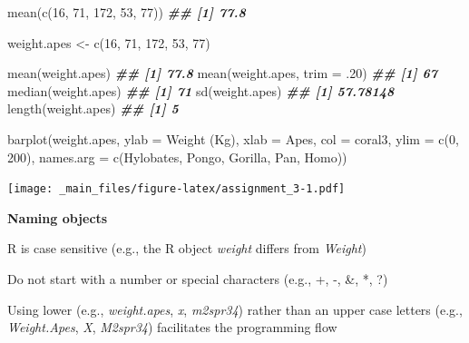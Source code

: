 \documentclass[
]{book}
\newenvironment{Shaded}{\begin{snugshade}}{\end{snugshade}}
\newcommand{\AttributeTok}[1]{\textcolor[rgb]{0.77,0.63,0.00}{#1}}
\newcommand{\DecValTok}[1]{\textcolor[rgb]{0.00,0.00,0.81}{#1}}
\newcommand{\DocumentationTok}[1]{\textcolor[rgb]{0.56,0.35,0.01}{\textbf{\textit{#1}}}}
\newcommand{\FunctionTok}[1]{\textcolor[rgb]{0.00,0.00,0.00}{#1}}
\newcommand{\NormalTok}[1]{#1}
\newcommand{\OtherTok}[1]{\textcolor[rgb]{0.56,0.35,0.01}{#1}}
\newcommand{\StringTok}[1]{\textcolor[rgb]{0.31,0.60,0.02}{#1}}
\theoremstyle{definition}
\theoremstyle{definition}
\theoremstyle{definition}
\theoremstyle{definition}
\theoremstyle{remark}
\begin{document}
\begin{Shaded}
\begin{Highlighting}[]

\FunctionTok{mean}\NormalTok{(}\FunctionTok{c}\NormalTok{(}\DecValTok{16}\NormalTok{, }\DecValTok{71}\NormalTok{, }\DecValTok{172}\NormalTok{, }\DecValTok{53}\NormalTok{, }\DecValTok{77}\NormalTok{))}
\DocumentationTok{\#\# [1] 77.8}

\NormalTok{weight.apes }\OtherTok{\textless{}{-}} \FunctionTok{c}\NormalTok{(}\DecValTok{16}\NormalTok{, }\DecValTok{71}\NormalTok{, }\DecValTok{172}\NormalTok{, }\DecValTok{53}\NormalTok{, }\DecValTok{77}\NormalTok{)}

\FunctionTok{mean}\NormalTok{(weight.apes)}
\DocumentationTok{\#\# [1] 77.8}
\FunctionTok{mean}\NormalTok{(weight.apes, }\AttributeTok{trim =}\NormalTok{ .}\DecValTok{20}\NormalTok{)}
\DocumentationTok{\#\# [1] 67}
\FunctionTok{median}\NormalTok{(weight.apes)}
\DocumentationTok{\#\# [1] 71}
\FunctionTok{sd}\NormalTok{(weight.apes)}
\DocumentationTok{\#\# [1] 57.78148}
\FunctionTok{length}\NormalTok{(weight.apes)}
\DocumentationTok{\#\# [1] 5}

\FunctionTok{barplot}\NormalTok{(weight.apes, }\AttributeTok{ylab =} \StringTok{\textquotesingle{}Weight (Kg)\textquotesingle{}}\NormalTok{, }\AttributeTok{xlab =} \StringTok{\textquotesingle{}Apes\textquotesingle{}}\NormalTok{,}
        \AttributeTok{col =} \StringTok{\textquotesingle{}coral3\textquotesingle{}}\NormalTok{, }\AttributeTok{ylim =} \FunctionTok{c}\NormalTok{(}\DecValTok{0}\NormalTok{, }\DecValTok{200}\NormalTok{),}
        \AttributeTok{names.arg =} \FunctionTok{c}\NormalTok{(}\StringTok{\textquotesingle{}Hylobates\textquotesingle{}}\NormalTok{, }\StringTok{\textquotesingle{}Pongo\textquotesingle{}}\NormalTok{, }\StringTok{\textquotesingle{}Gorilla\textquotesingle{}}\NormalTok{, }\StringTok{\textquotesingle{}Pan\textquotesingle{}}\NormalTok{, }\StringTok{\textquotesingle{}Homo\textquotesingle{}}\NormalTok{))}
\end{Highlighting}
\end{Shaded}

\texttt{[image: \_main\_files/figure-latex/assignment\_3-1.pdf]}

\textbf{Naming objects}

R is case sensitive (e.g., the R object \emph{weight} differs from \emph{Weight})

Do not start with a number or special characters (e.g., +, -, \&, *, ?)

Using lower (e.g., \emph{weight.apes}, \emph{x}, \emph{m2spr34}) rather than an upper case letters (e.g., \emph{Weight.Apes}, \emph{X}, \emph{M2spr34}) facilitates the programming flow
\end{document}

